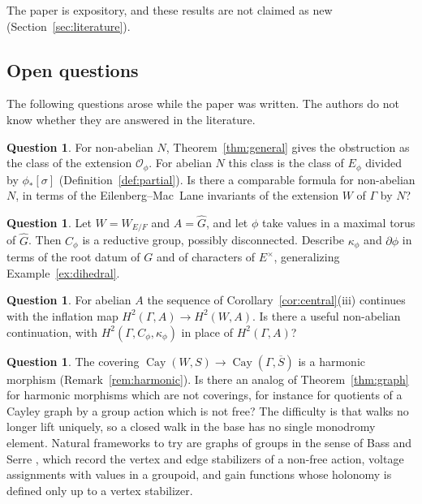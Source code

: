 \documentclass[12pt,letterpaper]{article}
\numberwithin{equation}{section}
\theoremstyle{plain}
\theoremstyle{definition}
\newtheorem{question}[theorem]{Question}
\newcommand{\Gh}{\widehat{G}}
\DeclareMathOperator{\Cay}{Cay}
\begin{document}
The paper is expository, and these results are not claimed as new
(Section~\ref{sec:literature}).

\subsection{Open questions}

The following questions arose while the paper was written. The authors
do not know whether they are answered in the literature.

\begin{question}\label{q:nonab}
For non-abelian $N$, Theorem~\ref{thm:general} gives the obstruction as
the class of the extension $\mathcal{O}_\phi$. For abelian $N$ this class
is the class of $E_\phi$ divided by $\phi_*[\sigma]$
(Definition~\ref{def:partial}). Is there a comparable formula for
non-abelian $N$, in terms of the Eilenberg--Mac~Lane invariants of the
extension $W$ of $\Gamma$ by $N$?
\end{question}

\begin{question}\label{q:roots}
Let $W=W_{E/F}$ and $A=\Gh$, and let $\phi$ take values in a maximal torus
of $\Gh$. Then $C_\phi$ is a reductive group, possibly disconnected.
Describe $\kappa_\phi$ and $\partial\phi$ in terms of the root datum of
$G$ and of characters of $E^\times$, generalizing
Example~\ref{ex:dihedral}.
\end{question}

\begin{question}\label{q:continue}
For abelian $A$ the sequence of Corollary~\ref{cor:central}(iii) continues
with the inflation map $H^2(\Gamma,A)\to H^2(W,A)$. Is there a useful
non-abelian continuation, with $H^2(\Gamma,C_\phi,\kappa_\phi)$ in place of
$H^2(\Gamma,A)$?
\end{question}

\begin{question}\label{q:harmonic}
The covering $\Cay(W,S)\to\Cay(\Gamma,\overline{S})$ is a harmonic
morphism (Remark~\ref{rem:harmonic}). Is there an analog of
Theorem~\ref{thm:graph} for harmonic morphisms which are not coverings,
for instance for quotients of a Cayley graph by a group action which is
not free? The difficulty is that walks no longer lift uniquely, so a
closed walk in the base has no single monodromy element. Natural
frameworks to try are graphs of groups in the sense of Bass and Serre
\cite{Se80}, which record the vertex and edge stabilizers of a non-free
action, voltage assignments with values in a groupoid, and gain functions
whose holonomy is defined only up to a vertex stabilizer.
\end{question}
\end{document}
